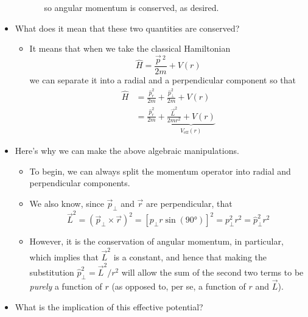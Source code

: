 \documentclass[../notes.tex]{subfiles}
\begin{document}
\begin{itemize}
\begin{itemize}
\begin{itemize}
            so angular momentum is conserved, as desired.
        \end{itemize}
    \end{itemize}
    \item What does it mean that these two quantities are conserved?
    \begin{itemize}
        \item It means that when we take the classical Hamiltonian
        \begin{equation*}
            \hat{H} = \frac{\vec{p}{\,}^2}{2m}+V(r)
        \end{equation*}
        we can separate it into a radial and a perpendicular component so that
        \begin{align*}
            \hat{H} &= \frac{\hat{p}_r^2}{2m}+\frac{\hat{p}_\perp^2}{2m}+V(r)\\
            &= \frac{\hat{p}_r^2}{2m}+\underbrace{\frac{\vec{L}^2}{2mr^2}+V(r)}_{V_\text{eff}(r)}
        \end{align*}
    \end{itemize}
    \item Here's why we can make the above algebraic manipulations.
    \begin{itemize}
        \item To begin, we can always split the momentum operator into radial and perpendicular components.
        \item We also know, since $\vec{p}_\perp$ and $\vec{r}$ are perpendicular, that
        \begin{equation*}
            \vec{L}^2 = (\vec{p}_\perp\times\vec{r})^2
            = [p_\perp r\sin(\ang{90})]^2
            = p_\perp^2r^2
            = \hat{p}_\perp^2r^2
        \end{equation*}
        \item However, it is the conservation of angular momentum, in particular, which implies that $\vec{L}^2$ is a constant, and hence that making the substitution $\hat{p}_\perp^2=\vec{L}^2/r^2$ will allow the sum of the second two terms to be \emph{purely} a function of $r$ (as opposed to, per se, a function of $r$ and $\vec{L}$).
    \end{itemize}
    \item What is the implication of this effective potential?
    \begin{figure}[h!]
        \centering
\end{figure}
\end{itemize}
\end{document}
